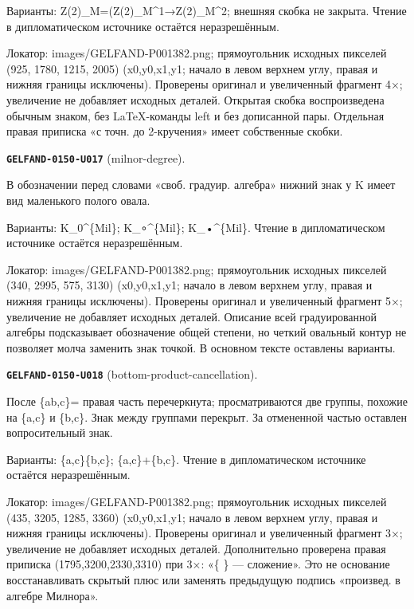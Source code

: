 \documentclass[11pt]{article}
\theoremstyle{definition}
\theoremstyle{remark}
\begin{document}
Варианты: Z(2)\_M=(Z(2)\_M\textasciicircum{}1→Z(2)\_M\textasciicircum{}2; внешняя скобка не закрыта. Чтение в дипломатическом источнике остаётся неразрешённым.\par
Локатор: images/GELFAND-P001382.png; прямоугольник исходных пикселей (925, 1780, 1215, 2005) (x0,y0,x1,y1; начало в левом верхнем углу, правая и нижняя границы исключены). Проверены оригинал и увеличенный фрагмент 4×; увеличение не добавляет исходных деталей. Открытая скобка воспроизведена обычным знаком, без LaTeX-команды left и без дописанной пары. Отдельная правая приписка «с точн. до 2-кручения» имеет собственные скобки.\par\medskip
\noindent\leavevmode{}\label{GELFAND-P001382:milnor-degree:note}\textbf{\texttt{GELFAND-0150-U017}} (milnor-degree).\par\nopagebreak[4]
В обозначении перед словами «своб. градуир. алгебра» нижний знак у K имеет вид маленького полого овала.\par
Варианты: K\_0\textasciicircum{}\{Mil\}; K\_∘\textasciicircum{}\{Mil\}; K\_•\textasciicircum{}\{Mil\}. Чтение в дипломатическом источнике остаётся неразрешённым.\par
Локатор: images/GELFAND-P001382.png; прямоугольник исходных пикселей (340, 2995, 575, 3130) (x0,y0,x1,y1; начало в левом верхнем углу, правая и нижняя границы исключены). Проверены оригинал и увеличенный фрагмент 5×; увеличение не добавляет исходных деталей. Описание всей градуированной алгебры подсказывает обозначение общей степени, но четкий овальный контур не позволяет молча заменить знак точкой. В основном тексте оставлены варианты.\par\medskip
\noindent\leavevmode{}\label{GELFAND-P001382:bottom-product-cancellation:note}\textbf{\texttt{GELFAND-0150-U018}} (bottom-product-cancellation).\par\nopagebreak[4]
После \{ab,c\}= правая часть перечеркнута; просматриваются две группы, похожие на \{a,c\} и \{b,c\}. Знак между группами перекрыт. За отмененной частью оставлен вопросительный знак.\par
Варианты: \{a,c\}\{b,c\}; \{a,c\}+\{b,c\}. Чтение в дипломатическом источнике остаётся неразрешённым.\par
Локатор: images/GELFAND-P001382.png; прямоугольник исходных пикселей (435, 3205, 1285, 3360) (x0,y0,x1,y1; начало в левом верхнем углу, правая и нижняя границы исключены). Проверены оригинал и увеличенный фрагмент 3×; увеличение не добавляет исходных деталей. Дополнительно проверена правая приписка (1795,3200,2330,3310) при 3×: «\{ \} — сложение». Это не основание восстанавливать скрытый плюс или заменять предыдущую подпись «произвед. в алгебре Милнора».\par\medskip
\end{document}
